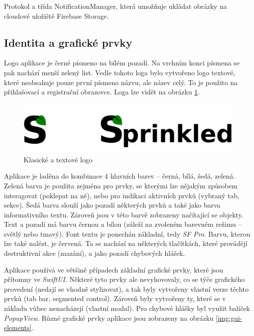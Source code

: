 \documentclass[thesis=M,czech]{FITthesis}[2019/12/23]
\begin{document}
\begin{listing}
    \inputminted{swift}{code/storage-manager.txt}
    \caption{Protokol a třída NotificationManager, která umožňuje ukládat obrázky na cloudové uložiště Firebase Storage.}
    \label{code:storage-manager}
\end{listing}

\subsection{Identita a grafické prvky}
Logo aplikace je černé písmeno  na bílém pozadí. Na vrchním konci písmena se pak nachází menší zelený list. Vedle tohoto loga bylo vytvořeno logo textové, které neobsahuje pouze první písmeno názvu, ale název celý. To je použito na přihlašovací a registrační obrazovce. Loga lze vidět na obrázku \ref{img:app-logos}.

\begin{figure}[H]
	\centering
	\includegraphics[width=0.65\linewidth]{images/app-logos.png}
  	\caption{Klasické a textové logo}
  	\label{img:app-logos}
\end{figure}

Aplikace je laděna do kombinace 4 hlavních barev -- černá, bílá, šedá, zelená. Zelená barva je použita zejména pro prvky, se kterými lze nějakým způsobem interagovat (poklepat na ně), nebo pro indikaci aktivních prvků (vybraný tab, sekce). Šedá barva slouží jako pozadí některých prvků a také jako barva informativního textu. Zároveň jsou v této barvě zobrazeny načítající se objekty. Text a pozadí má barvu černou a bílou (záleží na zvoleném barevném režimu -- světlý nebo tmavý). Font textu je ponechán základní, tedy \textit{SF Pro}. Barvu, kterou lze také nalézt, je červená. Ta se nachází na některých tlačítkách, které provádějí destruktivní akce (mazání), a jako pozadí chybových hlášek.

Aplikace používá ve většině případech základní grafické prvky, které jsou přítomny ve \textit{SwiftUI}. Některé tyto prvky ale nevyhovovaly, co se týče grafického provedení (nedají se vhodně stylizovat), a tak byly vytvořeny vlastní verze těchto prvků (tab bar, segmented control). Zároveň byly vytvořeny ty, které se v základu vůbec nenacházejí (vlastní modal). Pro chybové hlášky byl využit balíček \textit{PopupView}. Různé grafické prvky aplikace jsou zobrazeny na obrázku \ref{img:gui-elements}.
\end{document}
